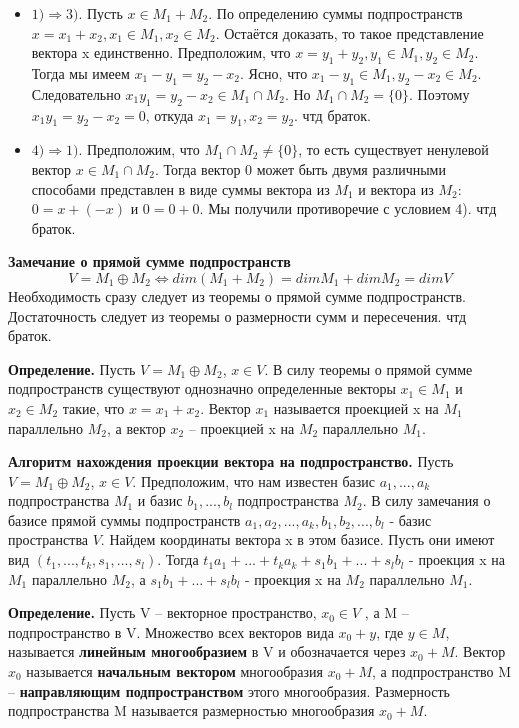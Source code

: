\documentclass[a4paper]{article}
\begin{document}
{\begin{small}
\begin{itemize}
\item $1) \Rightarrow 3)$. Пусть $x \in M_1 + M_2$. По определению суммы подпространств $x = x_1 + x_2, x_1 \in M_1, x_2 \in M_2$. Остаётся доказать, то такое представление вектора x единственно. Предположим, что $x = y_1 + y_2, y_1 \in M_1, y_2 \in M_2$. Тогда мы имеем $x_1-y_1 = y_2 - x_2$. Ясно, что $x_1 - y_1 \in M_1, y_2-x_2 \in M_2$. Следовательно $x_1y_1 = y_2 - x_2 \in M_1 \cap M_2$.
Но $M_1 \cap M_2 = \{ 0 \}$. Поэтому $x_1y_1 = y_2 - x_2 = 0$, откуда $x_1 = y_1, x_2 = y_2$. чтд браток.

\item $4) \Rightarrow 1)$. Предположим, что $M_1 \cap M_2 \neq \{ 0 \}$, то есть существует ненулевой вектор $x \in M_1 \cap M_2$. Тогда вектор 0 может быть двумя различными способами представлен в виде суммы вектора из $M_1$ и вектора из $M_2$: $0 = x+(-x)$ и $0 = 0+0$. Мы получили противоречие с условием 4). чтд браток.
\end{itemize}

\textbf{Замечание о прямой сумме подпространств} \begin{equation}
V = M_1 \oplus M_2 \Leftrightarrow dim(M_1 + M_2) = dim M_1 + dim M_2 = dim V
\end{equation}
Необходимость сразу следует из теоремы о прямой сумме подпространств.
Достаточность следует из теоремы о размерности сумм и пересечения. чтд браток.

\textbf{Определение.}  Пусть $V = M_1 \oplus M_2$, $x \in V$. В силу теоремы о прямой сумме подпространств существуют однозначно определенные векторы $x_1 \in M_1$ и
$x_2 \in M_2$ такие, что $x = x_1 + x_2$. Вектор $x_1$ называется проекцией x на $M_1$
параллельно $M_2$, а вектор $x_2$ – проекцией x на $M_2$ параллельно $M_1$.
 


\textbf{Алгоритм нахождения проекции вектора на подпространство.} Пусть $V = M_1 \oplus M_2$, $x \in V$. Предположим, что нам известен базис $a_1, ..., a_k$ подпространства $M_1$ и базис $b_1, ..., b_l$ подпространства $M_2$. В силу замечания о базисе прямой суммы подпространств $a_1, a_2, ..., a_k, b_1, b_2, ... ,b_l$ - базис пространства $V$. Найдем координаты вектора x в этом базисе. Пусть они имеют вид $(t_1, ..., t_k, s_1, ..., s_l)$. Тогда $t_1a_1 + ... + t_ka_k + s_1b_1 + ... + s_lb_l$ - проекция x на $M_1$ параллельно $M_2$, а $s_1b_1 + ... + s_lb_l$ - проекция x на $M_2$ параллельно $M_1$.


\textbf{Определение.} Пусть V – векторное пространство, $x_0 \in V$ , а M – подпространство в V.
Множество всех векторов вида $x_0 + y$, где $y \in M$, называется \textbf{линейным
многообразием} в V и обозначается через $x_0 + M$. Вектор $x_0$ называется
\textbf{начальным вектором }многообразия $x_0 + M$, а подпространство M –
\textbf{направляющим подпространством} этого многообразия. Размерность
подпространства M называется размерностью многообразия $x_0 + M$.


\end{small}}
\end{document}
